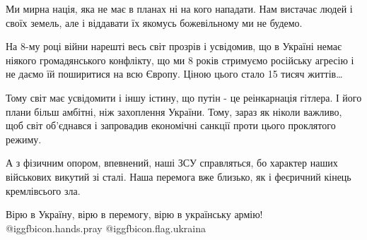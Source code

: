 Ми мирна нація, яка не має в планах ні на кого нападати. Нам вистачає людей і
своїх земель, але і віддавати їх якомусь божевільному ми не будемо. 

На 8-му році війни нарешті весь світ прозрів і усвідомив, що в Україні немає
ніякого громадянського конфлікту, що ми 8 років стримуємо російську агресію і
не даємо їй поширитися на всю Європу. Ціною цього стало 15 тисяч життів… 

Тому світ має усвідомити і іншу істину, що путін - це реінкарнація гітлера. І
його плани більш амбітні, ніж захоплення  України. Тому, зараз як ніколи
важливо, щоб світ об’єднався і запровадив економічні санкції проти цього
проклятого режиму. 

А з фізичним опором, впевнений, наші ЗСУ справляться, бо характер наших
військових викутий зі сталі. Наша перемога вже близько, як і феєричний кінець
кремлівсього зла. 

Вірю в Україну, вірю в перемогу, вірю в українську армію! @igg{fbicon.hands.pray} @igg{fbicon.flag.ukraina}
